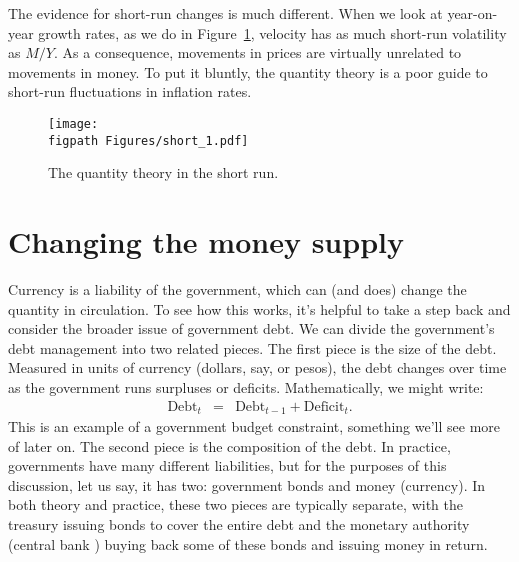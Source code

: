 The evidence for short-run changes is much different.
When we look at year-on-year growth rates,
as we do in Figure~\ref{fig:quantity_short},
velocity has as much short-run volatility as $M/Y$.
As a consequence,
movements in prices are virtually unrelated to movements in money.
To put it bluntly, the quantity theory is a poor guide to short-run fluctuations
in inflation rates.


\begin{figure}[h]
    \caption{The quantity theory in the short run.}
    \label{fig:quantity_short}
    \centering
    \texttt{[image: \\figpath Figures/short\_1.pdf]}
\end{figure}



\section{Changing the money supply}

Currency is a liability of the government,
which can (and does) change the quantity in circulation.
To see how this works, it's helpful to take a
step back and consider the broader issue of government debt.
We can divide the government's debt management into two
related pieces.
The first piece is the size of the debt.
Measured in units of currency (dollars, say, or pesos),
the debt changes over time as the government runs surpluses
or deficits.
Mathematically, we might write:
\begin{eqnarray*}
    \mbox{Debt}_{t} &=& \mbox{Debt}_{t-1} + \mbox{Deficit}_t .
\end{eqnarray*}
This is an example of a government budget constraint, something
we'll see more of later on.
The second piece is the composition of the debt.
In practice, governments have many different liabilities,
but for the purposes of this discussion, let us say, it has two:
government bonds  and money (currency).
In both theory and practice,
these two pieces are typically separate,
with the treasury issuing bonds  to cover the entire debt
and the monetary authority (central bank ) buying back
some of these bonds  and issuing money in return.

